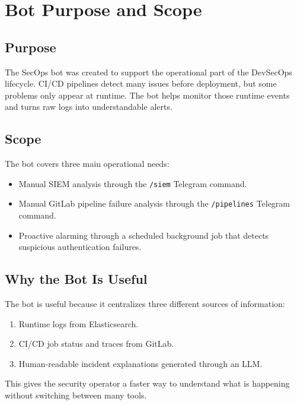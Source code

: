 \documentclass[12pt,a4paper]{report}
\begin{document}
\chapter{Bot Purpose and Scope}

\section{Purpose}

The SecOps bot was created to support the operational part of the DevSecOps lifecycle. CI/CD pipelines detect many issues before deployment, but some problems only appear at runtime. The bot helps monitor those runtime events and turns raw logs into understandable alerts.

\section{Scope}

The bot covers three main operational needs:

\begin{itemize}[leftmargin=*]
    \item Manual SIEM analysis through the \texttt{/siem} Telegram command.
    \item Manual GitLab pipeline failure analysis through the \texttt{/pipelines} Telegram command.
    \item Proactive alarming through a scheduled background job that detects suspicious authentication failures.
\end{itemize}

\section{Why the Bot Is Useful}

The bot is useful because it centralizes three different sources of information:

\begin{enumerate}[leftmargin=*]
    \item Runtime logs from Elasticsearch.
    \item CI/CD job status and traces from GitLab.
    \item Human-readable incident explanations generated through an LLM.
\end{enumerate}

This gives the security operator a faster way to understand what is happening without switching between many tools.
\end{document}
